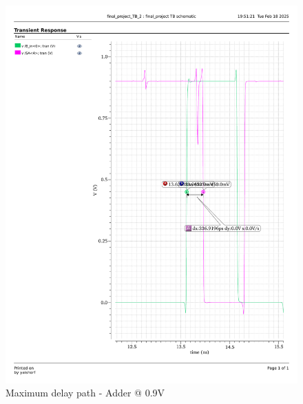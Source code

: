 \documentclass[a4paper,12pt]{article}
\begin{document}
\begin{figure}[H]
\begin{minipage}{0.49\textwidth}
        \includegraphics[width=\textwidth]{delay/CP_max_add_0.9.pdf}
        \caption{Maximum delay path - Adder @ 0.9V}
    \end{minipage}
\end{figure}
\end{document}
